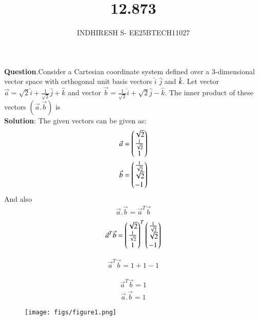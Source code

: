 \documentclass[journal]{IEEEtran}
\theoremstyle{remark}
\begin{document}

\onecolumn

\title{12.873}
\author{INDHIRESH S- EE25BTECH11027}
\maketitle


\renewcommand{\thefigure}{\theenumi}
\renewcommand{\thetable}{\theenumi}

\textbf{Question}.Consider a Cartesian coordinate system defined over a 3-dimensional vector space with orthogonal unit basis vectors $\hat{i}$
$\hat{j}$ and $\Hat{k}$. Let vector $\Vec{a}=\sqrt{2}\hat{i}+\frac{1}{\sqrt{2}}\hat{j}+\hat{k}$ and
vector $\Vec{b}=\frac{1}{\sqrt{2}}\hat{i}+\sqrt{2}\hat{j}-\hat{k}$. The inner product of these vectors $(\Vec{a}.\Vec{b})$ is\\
\textbf{Solution}:
The given vectors can be given as:
\begin{align}
 \Vec{a}=\begin{pmatrix}\sqrt{2}\\\frac{1}{\sqrt{2}}\\1\end{pmatrix}\\
 \Vec{b}=\begin{pmatrix}\frac{1}{\sqrt{2}}\\\sqrt{2}\\-1\end{pmatrix}
\end{align}
And also
\begin{align}
\Vec{a}.\Vec{b}=\Vec{a}^T\Vec{b}
\end{align}
\begin{align}
 \Vec{a}^T\Vec{b}=\begin{pmatrix}\sqrt{2}\\\frac{1}{\sqrt{2}}\\1\end{pmatrix}^T\begin{pmatrix}\frac{1}{\sqrt{2}}\\\sqrt{2}\\-1\end{pmatrix}
\end{align}

\begin{align}
    \Vec{a}^T\Vec{b}=1+1-1
\end{align}

\begin{align}
 \Vec{a}^T\Vec{b}=1
\end{align}
\begin{align}
    \Vec{a}.\Vec{b}=1
\end{align}

\begin{figure}[h]
    \centering
    \texttt{[image: figs/figure1.png]}
    \label{figure_1}
\end{figure}
\end{document}
